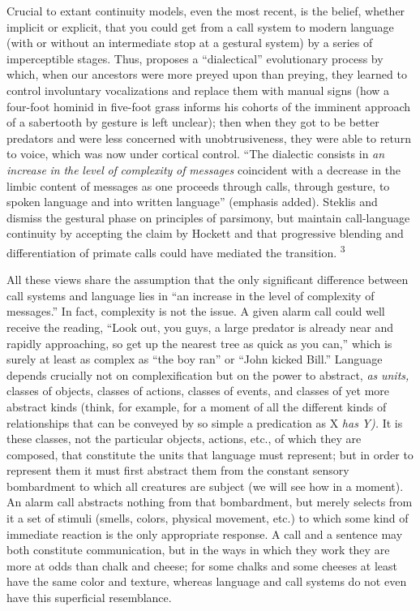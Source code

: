 Crucial to extant continuity models, even the most recent, is
the belief, whether implicit or explicit, that you could get from a call system to modern language (with or without an intermediate stop at a gestural system) by a series of imperceptible stages. Thus, \citet{Stephenson1979} proposes a ``dialectical'' evolutionary process by which, when our ancestors were more preyed upon than preying, they learned to control involuntary vocalizations and replace them with manual signs (how a four-foot hominid in five-foot grass informs his cohorts of the imminent approach of a sabertooth by gesture is left unclear); then when they got to be better predators and were less concerned with unobtrusiveness, they were able to return to voice, which was now under cortical control. ``The dialectic consists in \textit{an} \textit{increase} \textit{in} \textit{the} \textit{level} \textit{o}\textit{f} \textit{complexity} \textit{of} \textit{messages} coincident with a decrease in the limbic content of messages as one proceeds through calls, through gesture, to spoken language and into written language'' (emphasis added). Steklis and \citet{Raleigh1979} dismiss the gestural phase on principles of parsimony, but maintain call-language continuity by accepting the claim by Hockett and \citet{Ascher1964} that progressive blending and differentiation of primate calls could have mediated the transition. \textsuperscript{3}

All these views share the assumption that the only significant difference between call systems and language lies in ``an increase in the level of complexity of messages.'' In fact, complexity is not the issue. A given alarm call could well receive the reading, ``Look out, you guys, a large predator is already near and rapidly approaching, so get up the nearest tree as quick as you can,'' which is surely at least as complex as ``the boy ran'' or ``John kicked Bill.'' Language depends crucially not on complexification but on the power to abstract, \textit{as} \textit{units,} classes of objects, classes of actions, classes of events, and classes
of yet more abstract kinds (think, for example, for a moment of all the different kinds of relationships that can be conveyed by so simple a predication as X \textit{has} \textit{Y).} It is these classes, not the particular objects, actions, etc., of which they are composed, that constitute the units that language must represent; but in order to represent them it must first abstract them from the constant sensory bombardment to which all creatures are subject (we will see how in a moment). An alarm call
abstracts nothing from that bombardment, but merely selects from it a set of stimuli (smells, colors, physical movement, etc.) to which some kind of immediate reaction is the only appropriate response. A call and a sentence may both constitute communication, but in the ways in which they work they are more at odds than chalk and cheese; for some chalks and some cheeses at least have the same color and texture, whereas language and call systems do not even have this superficial resemblance.

